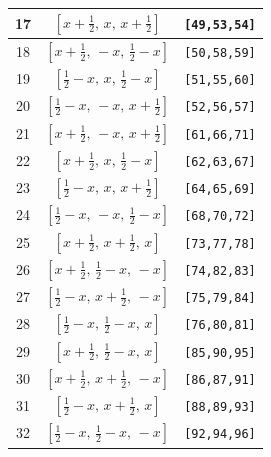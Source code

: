 \documentclass[fleqn,8pt]{jsarticle}
\begin{document}
\begin{longtable}{ccc}
17 & $\left[ x + \frac{1}{2},\, x,\, x + \frac{1}{2} \right]$ & {\tt [49,53,54]} \\ \hline
18 & $\left[ x + \frac{1}{2},\, - x,\, \frac{1}{2} - x \right]$ & {\tt [50,58,59]} \\ \hline
19 & $\left[ \frac{1}{2} - x,\, x,\, \frac{1}{2} - x \right]$ & {\tt [51,55,60]} \\ \hline
20 & $\left[ \frac{1}{2} - x,\, - x,\, x + \frac{1}{2} \right]$ & {\tt [52,56,57]} \\ \hline
21 & $\left[ x + \frac{1}{2},\, - x,\, x + \frac{1}{2} \right]$ & {\tt [61,66,71]} \\ \hline
22 & $\left[ x + \frac{1}{2},\, x,\, \frac{1}{2} - x \right]$ & {\tt [62,63,67]} \\ \hline
23 & $\left[ \frac{1}{2} - x,\, x,\, x + \frac{1}{2} \right]$ & {\tt [64,65,69]} \\ \hline
24 & $\left[ \frac{1}{2} - x,\, - x,\, \frac{1}{2} - x \right]$ & {\tt [68,70,72]} \\ \hline
25 & $\left[ x + \frac{1}{2},\, x + \frac{1}{2},\, x \right]$ & {\tt [73,77,78]} \\ \hline
26 & $\left[ x + \frac{1}{2},\, \frac{1}{2} - x,\, - x \right]$ & {\tt [74,82,83]} \\ \hline
27 & $\left[ \frac{1}{2} - x,\, x + \frac{1}{2},\, - x \right]$ & {\tt [75,79,84]} \\ \hline
28 & $\left[ \frac{1}{2} - x,\, \frac{1}{2} - x,\, x \right]$ & {\tt [76,80,81]} \\ \hline
29 & $\left[ x + \frac{1}{2},\, \frac{1}{2} - x,\, x \right]$ & {\tt [85,90,95]} \\ \hline
30 & $\left[ x + \frac{1}{2},\, x + \frac{1}{2},\, - x \right]$ & {\tt [86,87,91]} \\ \hline
31 & $\left[ \frac{1}{2} - x,\, x + \frac{1}{2},\, x \right]$ & {\tt [88,89,93]} \\ \hline
32 & $\left[ \frac{1}{2} - x,\, \frac{1}{2} - x,\, - x \right]$ & {\tt [92,94,96]} \\
\end{longtable}
\renewcommand{\arraystretch}{1.2}
\end{document}
